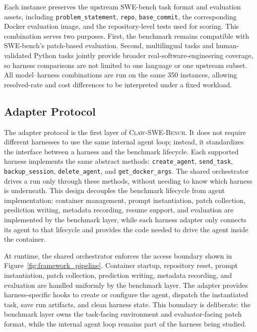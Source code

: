 Each instance preserves the upstream SWE-bench task format and evaluation assets, including \texttt{problem\_statement}, \texttt{repo}, \texttt{base\_commit}, the corresponding Docker evaluation image, and the repository-level tests used for scoring. This combination serves two purposes. First, the benchmark remains compatible with SWE-bench's patch-based evaluation. Second, multilingual tasks and human-validated Python tasks jointly provide broader real-software-engineering coverage, so harness comparisons are not limited to one language or one upstream subset. All model--harness combinations are run on the same 350 instances, allowing resolved-rate and cost differences to be interpreted under a fixed workload.

\subsection{Adapter Protocol}
\label{sec:adapter_protocol}

The adapter protocol is the first layer of \textsc{Claw-SWE-Bench}. It does not require different harnesses to use the same internal agent loop; instead, it standardizes the interface between a harness and the benchmark lifecycle. Each supported harness implements the same abstract methods: \texttt{create\_agent}, \texttt{send\_task}, \texttt{backup\_session}, \texttt{delete\_agent}, and \texttt{get\_docker\_args}. The shared orchestrator drives a run only through these methods, without needing to know which harness is underneath. This design decouples the benchmark lifecycle from agent implementation: container management, prompt instantiation, patch collection, prediction writing, metadata recording, resume support, and evaluation are implemented by the benchmark layer, while each harness adapter only connects its agent to that lifecycle and provides the code needed to drive the agent inside the container.

At runtime, the shared orchestrator enforces the access boundary shown in Figure~\ref{fig:framework_pipeline}. Container startup, repository reset, prompt instantiation, patch collection, prediction writing, metadata recording, and evaluation are handled uniformly by the benchmark layer. The adapter provides harness-specific hooks to create or configure the agent, dispatch the instantiated task, save run artifacts, and clean harness state. This boundary is deliberate: the benchmark layer owns the task-facing environment and evaluator-facing patch format, while the internal agent loop remains part of the harness being studied.

